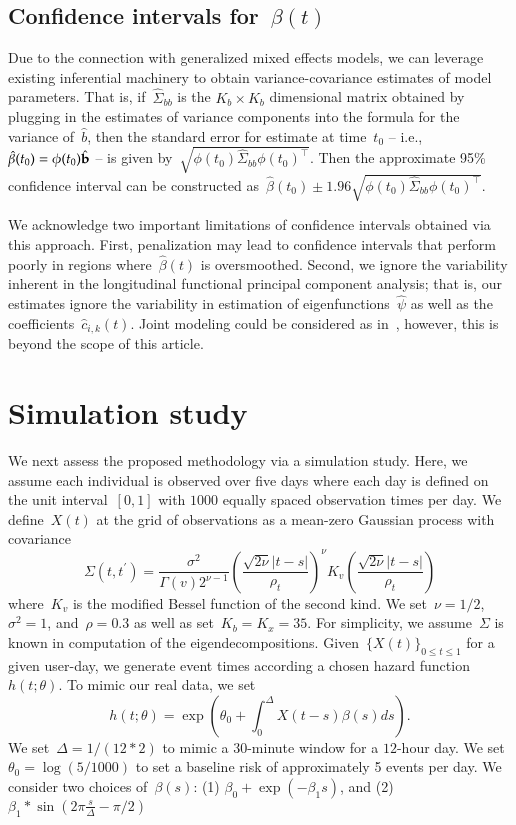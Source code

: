 \documentclass[12pt]{amsart}
\begin{document}
\subsection{Confidence intervals for~$\beta(t)$}

Due to the connection with generalized mixed effects models, we can leverage existing inferential machinery to obtain variance-covariance estimates of model parameters. That is, if~$\hat \Sigma_{bb}$ is the $K_b \times K_b$ dimensional matrix obtained by plugging in the estimates of variance components into the formula for the variance of~$\hat b$, then the standard error for estimate at time~$t_0$ -- i.e., ~$\hat \beta (t_0) = \phi(t_0) \hat {\bf b}$ -- is given by~$\sqrt{ \phi (t_0 ) \hat \Sigma_{bb} \phi(t_0)^\top}$.  Then the approximate 95\% confidence interval can be constructed as~$\hat \beta (t_0) \pm 1.96 \sqrt{\phi (t_0) \hat \Sigma_{bb} \phi(t_0)^\top}$.

We acknowledge two important limitations of confidence intervals obtained via this approach. First, penalization may lead to confidence intervals that perform poorly in regions where~$\hat \beta(t)$ is oversmoothed. Second, we ignore the variability inherent in the longitudinal functional principal component analysis; that is, our estimates ignore the variability in estimation of eigenfunctions~$\hat \psi$ as well as the coefficients~$\hat c_{i,k}(t)$. Joint modeling could be considered as in~\cite{Crainiceanu2010}, however, this is beyond the scope of this article.

\section{Simulation study} \label{section:simstudy}


We next assess the proposed methodology via a simulation study. Here, we assume each individual is observed over five days where each day is defined on the unit interval~$[0,1]$ with $1000$ equally spaced observation times per day. We define~$X(t)$ at the grid of observations as a mean-zero Gaussian process with covariance
\[
  \Sigma (t, t^\prime) =
  \frac{\sigma^2}{\Gamma (v) 2^{\nu-1}}
  \left( \frac{\sqrt{2 \nu} |t-s|}{\rho_t} \right)^{\nu}
  K_v \left( \frac{\sqrt{2 \nu} |t-s|}{\rho_t} \right)
\]
where~$K_v$ is the modified Bessel function of the second kind.  We set~$\nu = 1/2$, $\sigma^2 = 1$, and~$\rho = 0.3$ as well as set~$K_b = K_x = 35$.  For simplicity, we assume~$\Sigma$ is known in computation of the eigendecompositions. Given~$\{ X(t) \}_{0 \leq t \leq 1}$ for a given user-day, we generate event times according a chosen hazard function~$h (t; \theta)$.  To mimic our real data, we set
\[
h(t; \theta) = \exp \left( \theta_0 + \int_{0}^{\Delta} X(t-s) \beta(s) ds \right).
\]
We set~$\Delta = 1/(12*2)$ to mimic a $30$-minute window for a $12$-hour day.  We set~$\theta_0 = \log(5/1000)$ to set a baseline risk of approximately 5 events per day. We consider two choices of~$\beta(s)$: (1) $\beta_0 + \exp(- \beta_1 s) $, and (2) $\beta_1  * \sin \left( 2 \pi \frac{s}{\Delta} - \pi/2 \right)$
\end{document}
